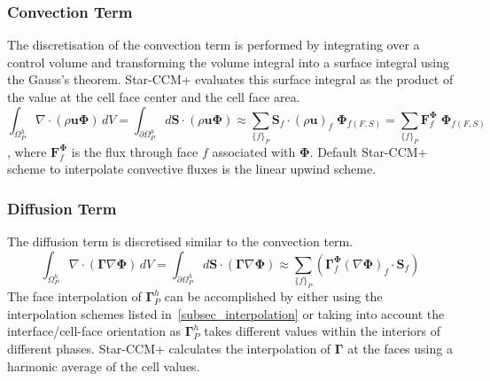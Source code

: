 \subsubsection{Convection Term}
The discretisation of the convection term is performed by integrating over a control volume and transforming the volume integral into a surface integral using
the Gauss's theorem. Star-CCM+ evaluates this surface integral as the product of the value at the cell face center and the cell face area.
\begin{equation}
    \int_{\Omega_{P}^{h}} \nabla \cdot (\rho \mathbf{u} \mathbf{\Phi})\,dV = \int_{\partial\Omega_{P}^{h}} d\mathbf{S}\cdot(\rho \mathbf{u} \mathbf{\Phi})
    \approx \sum_{\{f\}_{P}} \mathbf{S}_{f} \cdot (\rho \mathbf{u})_{f}\; \mathbf{\Phi}_{f(F,S)} = \sum_{\{f\}_{P}} \mathbf{F}^{\mathbf{\Phi}}_{f} \;\mathbf{\Phi}_{f(F,S)}
\end{equation},
where $\mathbf{F}_{f}^{\mathbf{\Phi}}$ is the flux through face $f$ associated with $\mathbf{\Phi}$.
Default Star-CCM+ scheme to interpolate convective fluxes is the linear upwind scheme.
\subsubsection{Diffusion Term}
The diffusion term is discretised similar to the convection term.
\begin{equation}
    \int_{\Omega_{P}^{h}} \nabla \cdot (\mathbf{\Gamma} \nabla \mathbf{\Phi})\,dV = \int_{\partial\Omega_{P}^{h}} d\mathbf{S}\cdot (\mathbf{\Gamma} \nabla \mathbf{\Phi})
    \approx \sum_{\{f\}_{P}} (\mathbf{\Gamma}^{\mathbf{\Phi}}_{f} (\nabla \mathbf{\Phi})_{f} \cdot \mathbf{S}_{f})
\end{equation}
The face interpolation of $\mathbf{\Gamma}_{P}^{h}$ can be accomplished by either using the interpolation schemes listed in~\ref{subsec_interpolation} or 
taking into account the interface/cell-face orientation as $\mathbf{\Gamma}_{P}^{h}$ takes different values within the interiors of different phases. 
Star-CCM+ calculates the interpolation of $\mathbf{\Gamma}$ at the faces using a harmonic average of the cell values. 
